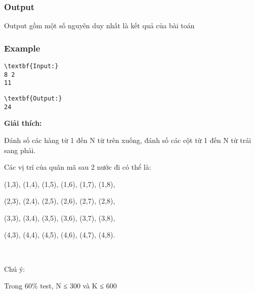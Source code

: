 \subsubsection{Output}

Output gồm một số nguyên duy nhất là kết quả của bài toán

\subsubsection{Example}
\begin{verbatim}
\textbf{Input:}
8 2
11\end{verbatim}
\begin{verbatim}
\textbf{Output:}
24\end{verbatim}




\textbf{​Giải thích:}

Đánh số các hàng từ 1 đến N từ trên xuống, đánh số các cột từ 1 đến N từ trái sang phải.

Các vị trí của quân mã sau 2 nước đi có thể là:

(1,3), (1,4), (1,5), (1,6), (1,7), (1,8),

(2,3), (2,4), (2,5), (2,6), (2,7), (2,8),

(3,3), (3,4), (3,5), (3,6), (3,7), (3,8),

(4,3), (4,4), (4,5), (4,6), (4,7), (4,8).

 

Chú ý:

Trong 60\% test, N ≤ 300 và K ≤ 600
